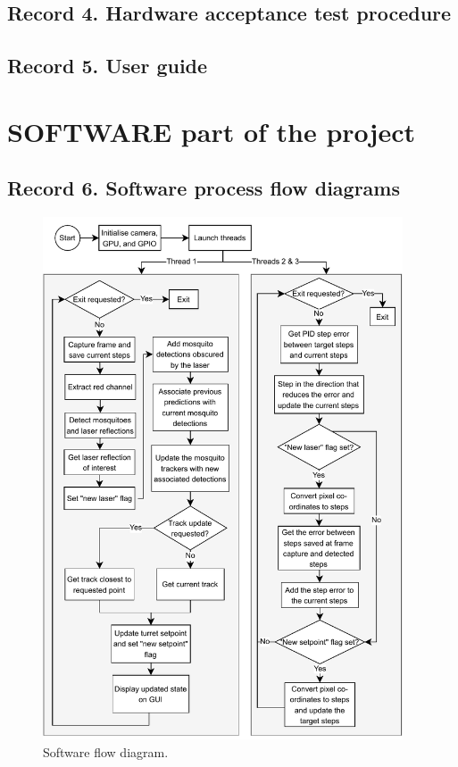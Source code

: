 \newpage
\subsection{Record 4. Hardware acceptance test procedure}

\newpage
\subsection{Record 5. User guide}



\newpage
\section{SOFTWARE part of the project}

\subsection{Record 6. Software process flow diagrams}
\begin{figure}[h]
  \centering
  \includegraphics[width=0.95\textwidth]{figures/software_flow_diagram.pdf}
  \caption{Software flow diagram.}
\end{figure}

